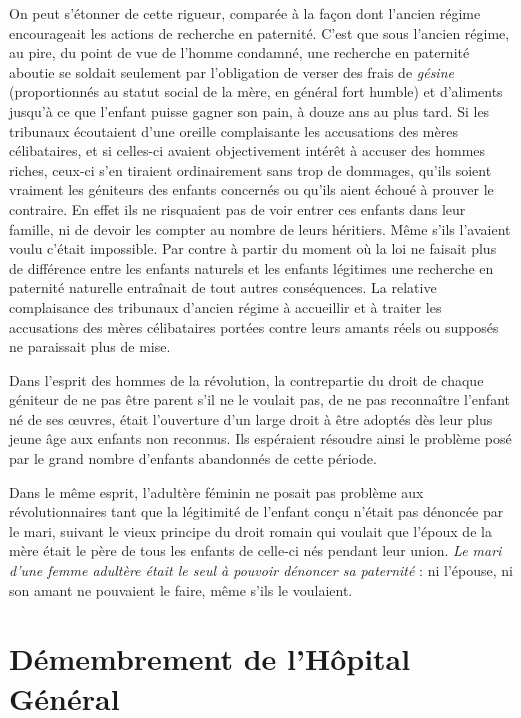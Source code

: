  On peut s'étonner de cette rigueur, comparée à la façon dont l'ancien régime encourageait les actions de recherche en paternité. C'est que sous l'ancien régime, au pire, du point de vue de l'homme condamné, une recherche en paternité aboutie se soldait seulement par l'obligation de verser des frais de \emph{gésine} (proportionnés au statut social de la mère, en général fort humble) et d'aliments jusqu'à ce que l'enfant puisse gagner son pain, à douze ans au plus tard. Si les tribunaux écoutaient d'une oreille complaisante les accusations des mères célibataires, et si celles-ci avaient objectivement intérêt à accuser des hommes riches, ceux-ci s'en tiraient ordinairement sans trop de dommages, qu'ils soient vraiment les géniteurs des enfants concernés ou qu'ils aient échoué à prouver le contraire. En effet ils ne risquaient pas de voir entrer ces enfants dans leur famille, ni de devoir les compter au nombre de leurs héritiers. Même s'ils l'avaient voulu c'était impossible. Par contre à partir du moment où la loi ne faisait plus de différence entre les enfants naturels et les enfants légitimes une recherche en paternité naturelle entraînait de tout autres conséquences. La relative complaisance des tribunaux d'ancien régime à accueillir et à traiter les accusations des mères célibataires portées contre leurs amants réels ou supposés ne paraissait plus de mise. 

 Dans l'esprit des hommes de la révolution, la contrepartie du droit de chaque géniteur de ne pas être parent s'il ne le voulait pas, de ne pas reconnaître l'enfant né de ses œuvres, était l'ouverture d'un large droit à être adoptés dès leur plus jeune âge aux enfants non reconnus. Ils espéraient résoudre ainsi le problème posé par le grand nombre d'enfants abandonnés de cette période. 

 Dans le même esprit, l'adultère féminin ne posait pas problème aux révolutionnaires tant que la légitimité de l'enfant conçu n'était pas dénoncée par le mari, suivant le vieux principe du droit romain qui voulait que l'époux de la mère était le père de tous les enfants de celle-ci nés pendant leur union. \emph{Le mari d'une femme adultère était le seul à pouvoir dénoncer sa paternité} : ni l'épouse, ni son amant ne pouvaient le faire, même s'ils le voulaient. 


\section{Démembrement de l'Hôpital Général}

